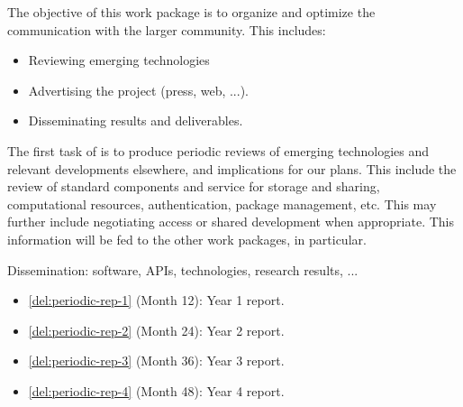 \addtocounter{wpno}{1}
\begin{Workpackage}{\thewpno}
\WPTitle{\wpname{\thewpno}}

\begin{WPObjectives}
  The objective of this work package is to organize and optimize the
  communication with the larger community. This includes:
  \begin{itemize}
  \item Reviewing emerging technologies
  \item Advertising the project (press, web, ...).
  \item Disseminating results and deliverables.
  \end{itemize}
\end{WPObjectives}

\begin{WPDescription}
  The first task of \theWP{} is to produce periodic reviews of
  emerging technologies and relevant developments elsewhere, and
  implications for our plans. This include the review of standard
  components and service for storage and sharing, computational
  resources, authentication, package management, etc.  This may
  further include negotiating access or shared development when
  appropriate. This information will be fed to the other work
  packages, in particular.

  Dissemination: software, APIs, technologies, research results, ...
\end{WPDescription}

\begin{WPDeliverables}
\begin{itemize}
\item \ref{del:periodic-rep-1}
  (Month 12): Year 1 report.
\item \ref{del:periodic-rep-2}
  (Month 24): Year 2 report.
\item \ref{del:periodic-rep-3}
  (Month 36): Year 3 report.
\item \ref{del:periodic-rep-4}
  (Month 48): Year 4 report.
\end{itemize}
\end{WPDeliverables}


\end{Workpackage}
